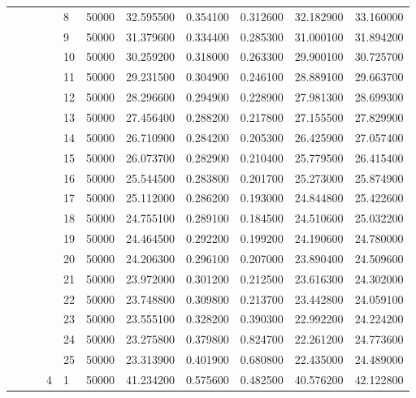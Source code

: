 \begin{tabular}{llllllrrrrr}
\cline{5-11}
 &  &  &  & 8 & 50000 & 32.595500 & 0.354100 & 0.312600 & 32.182900 & 33.160000 \\
\cline{5-11}
 &  &  &  & 9 & 50000 & 31.379600 & 0.334400 & 0.285300 & 31.000100 & 31.894200 \\
\cline{5-11}
 &  &  &  & 10 & 50000 & 30.259200 & 0.318000 & 0.263300 & 29.900100 & 30.725700 \\
\cline{5-11}
 &  &  &  & 11 & 50000 & 29.231500 & 0.304900 & 0.246100 & 28.889100 & 29.663700 \\
\cline{5-11}
 &  &  &  & 12 & 50000 & 28.296600 & 0.294900 & 0.228900 & 27.981300 & 28.699300 \\
\cline{5-11}
 &  &  &  & 13 & 50000 & 27.456400 & 0.288200 & 0.217800 & 27.155500 & 27.829900 \\
\cline{5-11}
 &  &  &  & 14 & 50000 & 26.710900 & 0.284200 & 0.205300 & 26.425900 & 27.057400 \\
\cline{5-11}
 &  &  &  & 15 & 50000 & 26.073700 & 0.282900 & 0.210400 & 25.779500 & 26.415400 \\
\cline{5-11}
 &  &  &  & 16 & 50000 & 25.544500 & 0.283800 & 0.201700 & 25.273000 & 25.874900 \\
\cline{5-11}
 &  &  &  & 17 & 50000 & 25.112000 & 0.286200 & 0.193000 & 24.844800 & 25.422600 \\
\cline{5-11}
 &  &  &  & 18 & 50000 & 24.755100 & 0.289100 & 0.184500 & 24.510600 & 25.032200 \\
\cline{5-11}
 &  &  &  & 19 & 50000 & 24.464500 & 0.292200 & 0.199200 & 24.190600 & 24.780000 \\
\cline{5-11}
 &  &  &  & 20 & 50000 & 24.206300 & 0.296100 & 0.207000 & 23.890400 & 24.509600 \\
\cline{5-11}
 &  &  &  & 21 & 50000 & 23.972000 & 0.301200 & 0.212500 & 23.616300 & 24.302000 \\
\cline{5-11}
 &  &  &  & 22 & 50000 & 23.748800 & 0.309800 & 0.213700 & 23.442800 & 24.059100 \\
\cline{5-11}
 &  &  &  & 23 & 50000 & 23.555100 & 0.328200 & 0.390300 & 22.992200 & 24.224200 \\
\cline{5-11}
 &  &  &  & 24 & 50000 & 23.275800 & 0.379800 & 0.824700 & 22.261200 & 24.773600 \\
\cline{5-11}
 &  &  &  & 25 & 50000 & 23.313900 & 0.401900 & 0.680800 & 22.435000 & 24.489000 \\
\cline{4-11} \cline{5-11}
 &  &  & \multirow[t]{25}{*}{4} & 1 & 50000 & 41.234200 & 0.575600 & 0.482500 & 40.576200 & 42.122800 \\

\end{tabular}
